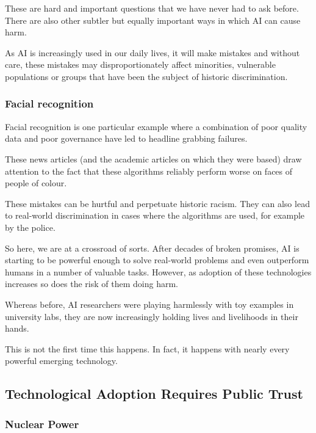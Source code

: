 \documentclass[
]{book}
\theoremstyle{definition}
\theoremstyle{definition}
\theoremstyle{definition}
\theoremstyle{definition}
\theoremstyle{remark}
\begin{document}
These are hard and important questions that we have never had to ask before. There are also other subtler but equally important ways in which AI can cause harm.

As AI is increasingly used in our daily lives, it will make mistakes and without care, these mistakes may disproportionately affect minorities, vulnerable populations or groups that have been the subject
of historic discrimination.

\hypertarget{facial-recognition}{%
\subsubsection{Facial recognition}\label{facial-recognition}}

Facial recognition is one particular example where a combination of poor quality data and poor governance have led to headline grabbing failures.

These news articles (and the academic articles on which they were based) draw attention to the fact that these algorithms reliably perform worse on faces of people of colour.

These mistakes can be hurtful and perpetuate historic racism. They can also lead to real-world discrimination in cases where the algorithms are used, for example by the police.

So here, we are at a crossroad of sorts. After decades of broken promises,
AI is starting to be powerful enough to solve real-world problems and even outperform humans in a number of valuable tasks. However, as adoption of these technologies increases so does the risk of them doing harm.

Whereas before, AI researchers were playing harmlessly with toy examples
in university labs, they are now increasingly holding lives and livelihoods in their hands.

This is not the first time this happens. In fact, it happens with nearly
every powerful emerging technology.

\hypertarget{technological-adoption-requires-public-trust}{%
\subsection{Technological Adoption Requires Public Trust}\label{technological-adoption-requires-public-trust}}

\hypertarget{nuclear-power}{%
\subsubsection{Nuclear Power}\label{nuclear-power}}
\end{document}
